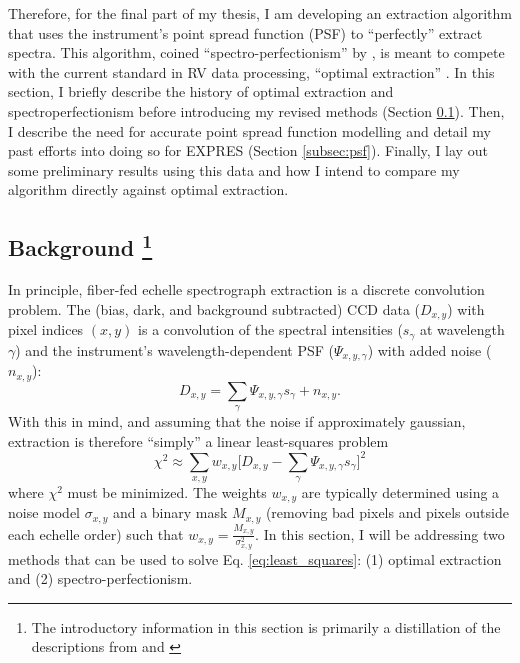 \documentclass[11pt]{article}
\begin{document}
Therefore, for the final part of my thesis, I am developing an extraction algorithm that uses the instrument's point spread function (PSF) to ``perfectly'' extract spectra. This algorithm, coined ``spectro-perfectionism'' by \citet{Bolton2009}, is meant to compete with the current standard in RV data processing, ``optimal extraction'' \citep{Horne1986}. In this section, I briefly describe the history of optimal extraction and spectroperfectionism before introducing my revised methods (Section \ref{subsec:spec_perf_intro}). Then, I describe the need for accurate point spread function modelling and detail my past efforts into doing so for EXPRES (Section \ref{subsec:psf}). Finally, I lay out some preliminary results using this data and how I intend to compare my algorithm directly against optimal extraction.

\subsection{Background \footnote{The introductory information in this section is primarily a distillation of the descriptions from \citet{Zechmeister2013} and \citet{Bolton2009}}}
\label{subsec:spec_perf_intro}

In principle, fiber-fed echelle spectrograph extraction is a discrete convolution problem. The (bias, dark, and background subtracted) CCD data ($D_{x,y}$) with pixel indices $(x, y)$ is a convolution of the spectral intensities ($s_\gamma$ at wavelength $\gamma$) and the instrument's wavelength-dependent PSF ($\Psi_{x,y,\gamma}$) with added noise ($n_{x,y}$):
\begin{equation}
    D_{x,y} = \sum_\gamma \Psi_{x,y,\gamma} s_\gamma + n_{x,y}.
\label{eq:convolution}
\end{equation}
With this in mind, and assuming that the noise if approximately gaussian, extraction is therefore ``simply'' a linear least-squares problem
\begin{equation}
    \chi^2 \approx \sum_{x,y} w_{x,y} \bigg[D_{x,y} - \sum_\gamma \Psi_{x,y,\gamma} s_\gamma \bigg]^2
    \label{eq:least_squares}
\end{equation}
where $\chi^2$ must be minimized. The weights $w_{x,y}$ are typically determined using a noise model $\sigma_{x,y}$ and a binary mask $M_{x,y}$ (removing bad pixels and pixels outside each echelle order) such that $w_{x,y}=\frac{M_{x,y}}{\sigma^2_{x,y}}$. In this section, I will be addressing two methods that can be used to solve Eq. \ref{eq:least_squares}: (1) optimal extraction and (2) spectro-perfectionism.
\end{document}
